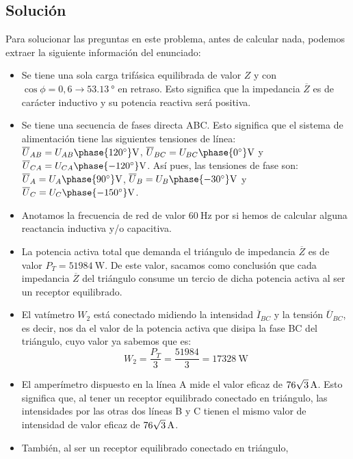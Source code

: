 \subsection*{Solución}

Para solucionar las preguntas en este problema, antes de calcular
nada, podemos extraer la siguiente información del enunciado:
\begin{itemize} %
\item Se tiene una sola carga trifásica equilibrada de valor $Z$ y con
  $\cos{\phi}=0,6\rightarrow \qty{53.13}{\degree}$ en retraso. Esto
  significa que la impedancia $\overline{Z}$ es de carácter inductivo
  y su potencia reactiva será positiva.
\item Se tiene una secuencia de fases directa ABC. Esto significa que
  el sistema de alimentación tiene las siguientes tensiones de línea:
  $\overline{U}_{AB}={U_{AB}\phase{\ang{120}}}\unit{\volt}$,
  $\overline{U}_{BC}={U_{BC}\phase{\ang{0}}}\unit{\volt}$
  y
  $\overline{U}_{CA}={U_{CA}\phase{\ang{-120}}}\unit{\volt}$. Así
  pues, las tensiones de fase son:
  $\overline{U}_{A}={U_{A}\phase{\ang{90}}}\unit{\volt}$,
  $\overline{U}_{B}={U_{B}\phase{\ang{-30}}}\unit{\volt}$
  y
  $\overline{U}_{C}={U_{C}\phase{\ang{-150}}}\unit{\volt}$.
\item Anotamos la frecuencia de red de valor $\qty{60}{\hertz}$ por si
  hemos de calcular alguna reactancia inductiva y/o capacitiva.
\item La potencia activa total que demanda el triángulo de impedancia
  $\overline{Z}$ es de valor $P_T=\qty{51984}{\watt}$. De este valor,
  sacamos como conclusión que cada impedancia $\overline{Z}$ del
  triángulo consume un tercio de dicha potencia activa al ser un
  receptor equilibrado.
\item El vatímetro $W_2$ está conectado midiendo la intensidad
  $\overline{I}_{BC}$ y la tensión $\overline{U}_{BC}$, es decir, nos
  da el valor de la potencia activa que disipa la fase BC del
  triángulo, cuyo valor ya sabemos que es:
  \[
    W_2=\dfrac{P_T}{3}=\dfrac{51984}{3}=\qty{17328}{\watt}
  \]
\item El amperímetro dispuesto en la línea A mide el valor eficaz de
  $\qty[parse-numbers=false]{76\sqrt{3}}{\ampere}$. Esto significa que,
  al tener un receptor equilibrado conectado en triángulo, las
  intensidades por las otras dos líneas B y C tienen el mismo valor de
  intensidad de valor eficaz de
  $\qty[parse-numbers=false]{76\sqrt{3}}{\ampere}$.
\item También, al ser un receptor equilibrado conectado en triángulo,

\end{itemize}

